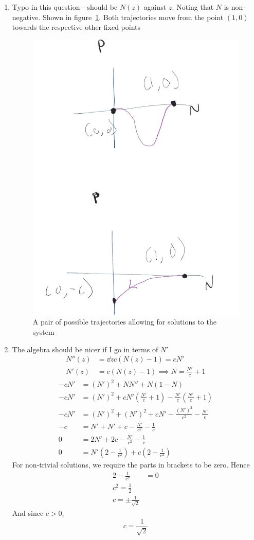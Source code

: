 \documentclass{X:/Documents/Coding/Latex/myassignment}
\begin{document}
\begin{enumerate}
\begin{enumerate}
		\clearpage
		\item Typo in this question - should be $N(z)$ against $z$. Noting that $N$ is non-negative. Shown in figure~\ref{fig:sketch}. Both trajectories move from the point $(1,0)$ towards the respective other fixed points
		\begin{figure}[h]
			\centering
			\includegraphics[width = 0.7\linewidth]{sketch.jpg}
			\caption{A pair of possible trajectories allowing for solutions to the system}
			\label{fig:sketch}
		\end{figure}

		\item 
		
		The algebra should be nicer if I go in terms of $N'$
		\begin{align*}
			N''(z) &= \dd{}z c(N(z) - 1) = c N '\\
			N'(z) &= c(N(z) - 1) \implies N = \frac{N'}{c} + 1
		\end{align*}
		\begin{align*}
			-cN' &= (N')^2 + N N'' + N(1-N)\\
			-cN' &= (N')^2 + cN'(\frac{N'}{c} + 1) - \frac{N'}{c}(\frac{N'}{c} + 1)\\
			-cN' &= (N')^2 + (N')^2 + cN' - \frac{(N')^2}{c^2} - \frac{N'}{c}\\
			-c &= N' + N' + c - \frac{N'}{c^2} - \frac{1}{c}\\
			0 &= 2N' + 2c - \frac{N'}{c^2} - \frac{1}{c}\\
			0 &= N'\left(2 - \frac{1}{c^2}\right) + c\left(2 - \frac{1}{c^2}\right)
		\end{align*}
		For non-trivial solutions, we require the parts in brackets to be zero.
		Hence
		\begin{align*}
			2 - \frac1{c^2} &= 0 \\
			c^2 = \frac12\\
			c = \pm \frac{1}{\sqrt{2}}
		\end{align*}
		And since $c > 0$, 
		\[\boxed{c = \frac{1}{\sqrt{2}}}\]
		

\end{enumerate}
\end{enumerate}
\end{document}
